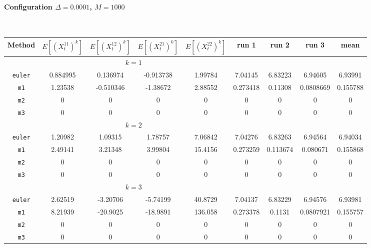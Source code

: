 \paragraph*{Configuration $\Delta=0.0001$, $M=1000$}\hfill\\
\begin{tabular}{@{}*{9}{c}@{}}
Method & $E[(X^{11}_t)^k]$ & $E[(X^{12}_t)^k]$ & $E[(X^{21}_t)^k]$ & $E[(X^{22}_t)^k]$ & run 1 & run 2 & run 3 & mean\\
\hline
\multicolumn{6}{c}{$k=1$}\\
\verb+euler+ & 0.884995 & 0.136974 & -0.913738 & 1.99784 & 7.04145 & 6.83223 & 6.94605 & 6.93991 \\
 \verb+m1+ & 1.23538 & -0.510346 & -1.38672 & 2.88552 & 0.273418 & 0.11308 & 0.0808669 & 0.155788 \\
 \verb+m2+ & 0 & 0 & 0 & 0 & 0 & 0 & 0 & 0 \\
 \verb+m3+ & 0 & 0 & 0 & 0 & 0 & 0 & 0 & 0 \\
\hline
\multicolumn{6}{c}{$k=2$}\\
\verb+euler+ & 1.20982 & 1.09315 & 1.78757 & 7.06842 & 7.04276 & 6.83263 & 6.94564 & 6.94034 \\
 \verb+m1+ & 2.49141 & 3.21348 & 3.99804 & 15.4156 & 0.273259 & 0.113674 & 0.080671 & 0.155868 \\
 \verb+m2+ & 0 & 0 & 0 & 0 & 0 & 0 & 0 & 0 \\
 \verb+m3+ & 0 & 0 & 0 & 0 & 0 & 0 & 0 & 0 \\
\hline
\multicolumn{6}{c}{$k=3$}\\
\verb+euler+ & 2.62519 & -3.20706 & -5.74199 & 40.8729 & 7.04137 & 6.83229 & 6.94576 & 6.93981 \\
 \verb+m1+ & 8.21939 & -20.9025 & -18.9891 & 136.058 & 0.273378 & 0.1131 & 0.0807921 & 0.155757 \\
 \verb+m2+ & 0 & 0 & 0 & 0 & 0 & 0 & 0 & 0 \\
 \verb+m3+ & 0 & 0 & 0 & 0 & 0 & 0 & 0 & 0 
\end{tabular}\hfill\\
